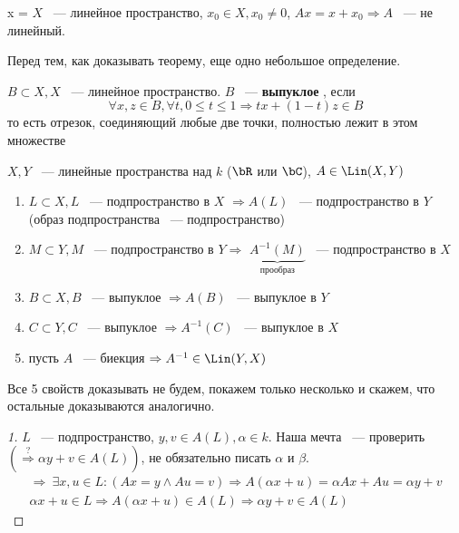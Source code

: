 \documentclass[document]{subfiles}
\begin{document}
\begin{example}x =
    $X$ ~--- линейное пространство, $x_0 \in X, x_0 \ne 0$, $Ax = x + x_0 \Rightarrow A$ ~--- не линейный.
\end{example}
 
Перед тем, как доказывать теорему, еще одно небольшое определение.
\begin{definition}
    $B \subset X, X$ ~--- линейное пространство. $B$ ~--- \textbf{ выпуклое }, если 
    \[ \forall x,z \in B, \forall t, 0 \leq t \leq 1 \Rightarrow tx + (1-t)z \in B \]
    то есть отрезок, соединяющий любые две точки, полностью лежит в этом множестве
\end{definition}
 
\begin{theorem}
    $X,Y$ ~--- линейные пространства над $k$ ($\bR$ или $\bC$), $A \in \Lin(X,Y)$
    \begin{enumerate}
        \item $L \subset X, L$ ~--- подпространство в $X$ $\Rightarrow A(L)$ ~--- подпространство в $Y$ (образ подпространства ~--- подпространство)
        \item $M \subset Y, M$ ~--- подпространство в $Y \Rightarrow$ $\underbrace{A^{-1}(M)}_{\text{прообраз}}$ ~--- подпространство в $X$
        \item $B \subset X, B$ ~--- выпуклое $\Rightarrow A(B)$ ~--- выпуклое в $Y$
        \item $C \subset Y, C$ ~--- выпуклое $\Rightarrow A^{-1}(C)$ ~--- выпуклое в $X$
        \item пусть $A$ ~--- биекция $\Rightarrow A^{-1} \in \Lin(Y,X)$
    \end{enumerate}
\end{theorem}
Все 5 свойств доказывать не будем, покажем только несколько и скажем, что остальные доказываются аналогично.
\begin{proof}[1]
    $L$ ~--- подпространство, $y,v \in A(L), \alpha \in k$. Наша мечта ~--- проверить $(\stackrel{?}{\Rightarrow} \alpha y + v \in A(L))$, не обязательно писать $\alpha$ и $\beta$.
    \begin{gather*}
        \Rightarrow \: \exists x,u \in L : (Ax = y \land Au = v) \Rightarrow A(\alpha x + u) = \alpha A x + A u = \alpha y + v \\
        \alpha x + u \in L \Rightarrow A(\alpha x + u) \in A(L) \Rightarrow \alpha y + v \in A(L)
    \end{gather*}
\end{proof}
 
\end{document}
